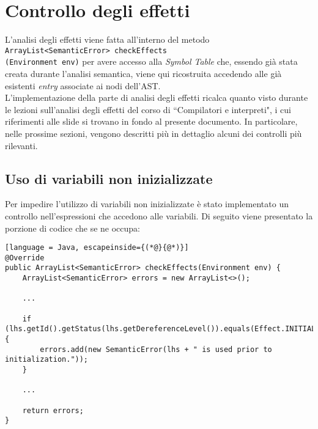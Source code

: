 \documentclass[../report.tex]{subfiles}
\begin{document}
\section{Controllo degli effetti}\label{s:controllo-effetti}
L'analisi degli effetti viene fatta all'interno del metodo \verb|ArrayList<SemanticError> checkEffects|\\\verb|(Environment env)| per avere accesso alla \textit{Symbol Table} che, essendo già stata creata durante l'analisi semantica, viene qui ricostruita accedendo alle già esistenti \textit{entry} associate ai nodi dell'AST.\\
\noindent
L'implementazione della parte di analisi degli effetti ricalca quanto visto durante le lezioni sull'analisi degli effetti del corso di ``Compilatori e interpreti", i cui riferimenti alle slide si trovano in fondo al presente documento.
In particolare, nelle prossime sezioni, vengono descritti più in dettaglio alcuni dei controlli più rilevanti.

\subsection{Uso di variabili non inizializzate}\label{s:uso-variabili-non-inizializzate}
Per impedire l'utilizzo di variabili non inizializzate è stato implementato un controllo nell'espressioni che accedono alle variabili.
Di seguito viene presentato la porzione di codice che se ne occupa:
\begin{lstlisting}[language = Java, escapeinside={(*@}{@*)}]
@Override
public ArrayList<SemanticError> checkEffects(Environment env) {
    ArrayList<SemanticError> errors = new ArrayList<>();

    ...

    if (lhs.getId().getStatus(lhs.getDereferenceLevel()).equals(Effect.INITIALIZED)) {
        errors.add(new SemanticError(lhs + " is used prior to initialization."));
    }

    ...

    return errors;
}
\end{lstlisting}
\end{document}
